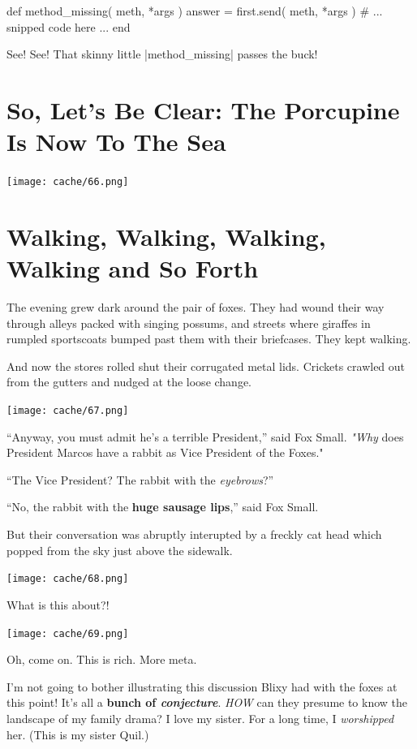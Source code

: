 \documentclass[12pt,twoside]{report}
\begin{document}
\begin{rubycode}

 def method_missing( meth, *args )
   answer = first.send( meth, *args )
   # ... snipped code here ...
 end

\end{rubycode}


See!  See!  That skinny little
\rubyinline|method_missing| passes the buck!


\section{So, Let's Be Clear: The Porcupine Is Now To The Sea}


	\texttt{[image: cache/66.png]}


\section{Walking, Walking, Walking, Walking and So Forth}


The evening grew dark around the pair of foxes.  They had wound their
way through alleys packed with singing possums, and streets where
giraffes in rumpled sportscoats bumped past them with their
briefcases.  They kept walking.

And now the stores rolled shut their corrugated metal lids.  Crickets
crawled out from the gutters and nudged at the loose change.

	\texttt{[image: cache/67.png]}

``Anyway, you must admit he's a terrible President,'' said Fox
        Small. {\em "Why} does President Marcos have a rabbit as Vice
        President of the Foxes."

``The Vice President?  The rabbit with the {\em eyebrows}?''

``No, the rabbit with the {\bf huge sausage lips},'' said Fox Small.

But their conversation was abruptly interupted by a freckly cat head
which popped from the sky just above the sidewalk.

	\texttt{[image: cache/68.png]}

What is this about?!

	\texttt{[image: cache/69.png]}

Oh, come on.  This is rich.  More meta.

I'm not going to bother illustrating this discussion Blixy had with
the foxes at this point! It's all a {\bf bunch of {\em conjecture}}.
{\em HOW} can they presume to know the landscape of my family drama? I
love my sister.  For a long time, I {\em worshipped} her. (This is my
sister Quil.)
\end{document}
